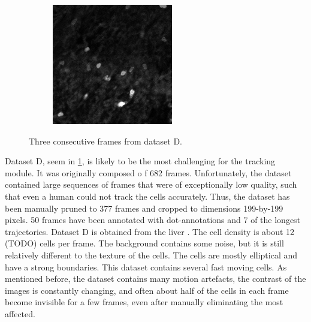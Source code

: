 \begin{figure}[h]
\begin{subfigure}{.32\textwidth}
		\end{subfigure}
		\hfill
		\begin{subfigure}{.32\textwidth}
		\includegraphics[width=\textwidth]{images/series14croppedclean027}
		\end{subfigure}
		\caption{Three consecutive frames from dataset D.}
		\label{fig:data_datasetD}
	\end{figure}

 	Dataset D, seem in \cref{fig:data_datasetD}, is likely to be the most challenging for the tracking module. It was originally composed o f 682 frames. Unfortunately, the dataset contained large sequences of frames that were of exceptionally low quality, such that even a human could not track the cells accurately. Thus, the dataset has been manually pruned to 377 frames and cropped to dimensions 199-by-199 pixels. 50 frames have been annotated with dot-annotations and 7 of the longest trajectories. Dataset D is obtained from the liver . The cell density is about 12 (TODO) cells per frame. The background contains some noise, but it is still relatively different to the texture of the cells. The cells are mostly elliptical and have a strong boundaries. This dataset contains several fast moving cells. As mentioned before, the dataset contains many motion artefacts, the contrast of the images is constantly changing, and often about half of the cells in each frame become invisible for a few frames, even after manually eliminating the most affected.
	
